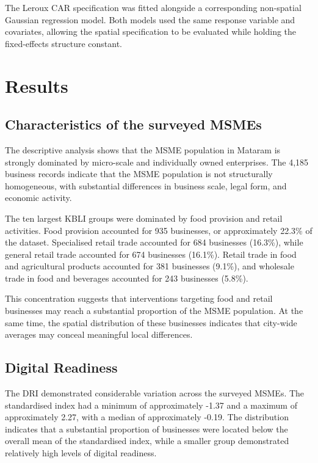 \documentclass[
  default,
]{sn-jnl}
\begin{document}
The Leroux CAR specification was fitted alongside a corresponding
non-spatial Gaussian regression model. Both models used the same
response variable and covariates, allowing the spatial specification to
be evaluated while holding the fixed-effects structure constant.

\section{Results}\label{results}

\subsection{Characteristics of the surveyed
MSMEs}\label{characteristics-of-the-surveyed-msmes}

The descriptive analysis shows that the MSME population in Mataram is
strongly dominated by micro-scale and individually owned enterprises.
The 4,185 business records indicate that the MSME population is not
structurally homogeneous, with substantial differences in business
scale, legal form, and economic activity.

The ten largest KBLI groups were dominated by food provision and retail
activities. Food provision accounted for 935 businesses, or
approximately 22.3\% of the dataset. Specialised retail trade accounted
for 684 businesses (16.3\%), while general retail trade accounted for
674 businesses (16.1\%). Retail trade in food and agricultural products
accounted for 381 businesses (9.1\%), and wholesale trade in food and
beverages accounted for 243 businesses (5.8\%).

This concentration suggests that interventions targeting food and retail
businesses may reach a substantial proportion of the MSME population. At
the same time, the spatial distribution of these businesses indicates
that city-wide averages may conceal meaningful local differences.

\subsection{Digital Readiness}\label{digital-readiness}

The DRI demonstrated considerable variation across the surveyed MSMEs.
The standardised index had a minimum of approximately -1.37 and a
maximum of approximately 2.27, with a median of approximately -0.19. The
distribution indicates that a substantial proportion of businesses were
located below the overall mean of the standardised index, while a
smaller group demonstrated relatively high levels of digital readiness.
\end{document}

